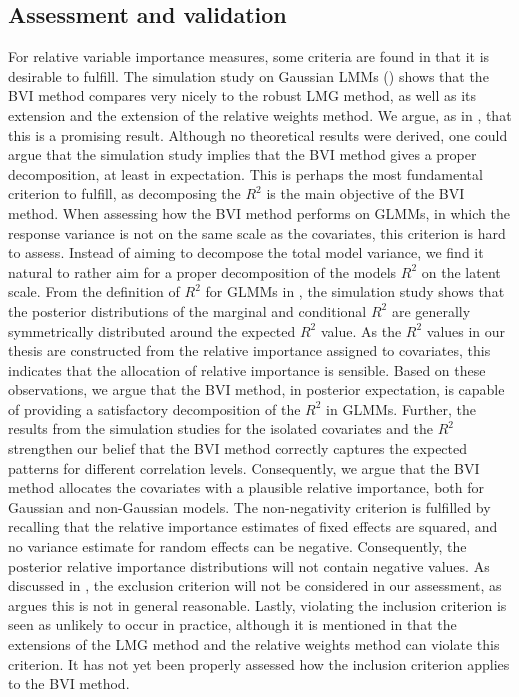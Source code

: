 \subsection*{Assessment and validation}
For relative variable importance measures, some criteria are found in  that it is desirable to fulfill. The simulation study on Gaussian LMMs () shows that the BVI method compares very nicely to the robust LMG method, as well as its extension and the extension of the relative weights method. We argue, as in \citet{Arnstad:Relative_variable_importance_in_Bayesian_linear_mixed_models:2024}, that this is a promising result. Although no theoretical results were derived, one could argue that the simulation study implies that the BVI method gives a proper decomposition, at least in expectation. This is perhaps the most fundamental criterion to fulfill, as decomposing the $R^2$ is the main objective of the BVI method.
When assessing how the BVI method performs on GLMMs, in which the response variance is not on the same scale as the covariates, this criterion is hard to assess. Instead of aiming to decompose the total model variance, we find it natural to rather aim for a proper decomposition of the models $R^2$ on the latent scale. From the definition of $R^2$ for GLMMs in \citet{nakagawa2013general}, the simulation study shows that the posterior distributions of the marginal and conditional $R^2$ are generally symmetrically distributed around the expected $R^2$ value. As the $R^2$ values in our thesis are constructed from the relative importance assigned to covariates, this indicates that the allocation of relative importance is sensible. Based on these observations, we argue that the BVI method, in posterior expectation, is capable of providing a satisfactory decomposition of the $R^2$ in GLMMs. Further, the results from the simulation studies for the isolated covariates and the $R^2$ strengthen our belief that the BVI method correctly captures the expected patterns for different correlation levels. Consequently, we argue that the BVI method allocates the covariates with a plausible relative importance, both for Gaussian and non-Gaussian models.
The non-negativity criterion is fulfilled by recalling that the relative importance estimates of fixed effects are squared, and no variance estimate for random effects can be negative. Consequently, the posterior relative importance distributions will not contain negative values. As discussed in \citet{Arnstad:Relative_variable_importance_in_Bayesian_linear_mixed_models:2024}, the exclusion criterion will not be considered in our assessment, as \citet{gromping_relaimpo} argues this is not in general reasonable. Lastly, violating the inclusion criterion is seen as unlikely to occur in practice, although it is mentioned in \citet{matre} that the extensions of the LMG method and the relative weights method can violate this criterion. It has not yet been properly assessed how the inclusion criterion applies to the BVI method. 
